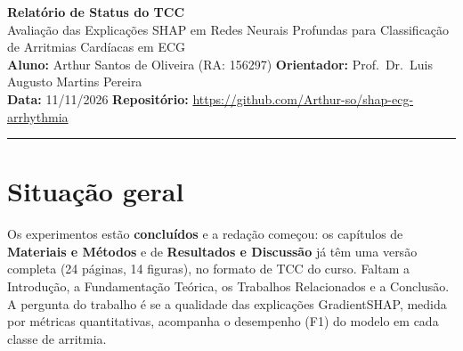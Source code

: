 \documentclass[11pt,a4paper]{article}
\begin{document}
\begin{center}
    {\Large \textbf{Relatório de Status do TCC}} \\[0.25em]
    {\normalsize Avaliação das Explicações SHAP em Redes Neurais Profundas para Classificação de Arritmias Cardíacas em ECG} \\[0.2em]
    \textbf{Aluno:} Arthur Santos de Oliveira (RA: 156297) \quad \textbf{Orientador:} Prof.\ Dr.\ Luis Augusto Martins Pereira \\[0.15em]
    \textbf{Data:} 11/11/2026 \quad \textbf{Repositório:} \url{https://github.com/Arthur-so/shap-ecg-arrhythmia}
\end{center}
\vspace{-0.6em}
\hrule
\vspace{0.5em}

\section{Situação geral}
Os experimentos estão \textbf{concluídos} e a redação começou: os capítulos de \textbf{Materiais e Métodos} e de \textbf{Resultados e Discussão} já têm uma versão completa (24 páginas, 14 figuras), no formato de TCC do curso. Faltam a Introdução, a Fundamentação Teórica, os Trabalhos Relacionados e a Conclusão. A pergunta do trabalho é se a qualidade das explicações GradientSHAP, medida por métricas quantitativas, acompanha o desempenho (F1) do modelo em cada classe de arritmia.
\end{document}
